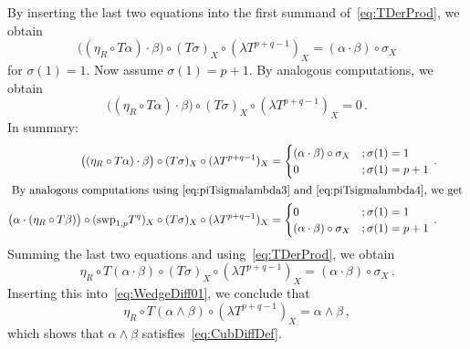 \documentclass[12pt,reqno, a4paper]{amsart}
\numberwithin{equation}{section}
\theoremstyle{plain}
\theoremstyle{definition}
\theoremstyle{remark}
\newcommand{\Val}{\eta}
\newcommand{\Swp}{\mathrm{swp}}
\begin{document}
By inserting the last two equations into the first summand of~\eqref{eq:TDerProd}, we obtain
\begin{equation}
  \bigl((\Val_R \circ T\alpha) \cdot \beta \bigr)
  \circ (T\sigma)_X \circ (\lambda T^{p+q-1})_X
  = (\alpha \cdot \beta) \circ \sigma_X
\end{equation}
for $\sigma(1) = 1$. Now assume $\sigma(1) = p+1$. By analogous computations, we obtain
\begin{equation}
  \bigl((\Val_R \circ T\alpha) \cdot \beta \bigr)
  \circ (T\sigma)_X \circ (\lambda T^{p+q-1})_X
  = 0
  \,.
\end{equation}
In summary:
\begin{align*}
  \bigl((\Val_R \circ T\alpha) \cdot \beta \bigr)
  \circ (T\sigma)_X \circ (\lambda T^{p+q-1})_X
  &=
  \begin{cases}
    (\alpha \cdot \beta) \circ \sigma_X &; \sigma(1) = 1 \\
    0 &;  \sigma(1) = p+1
  \end{cases}
  \,.
  \\
  \intertext{
By analogous computations using~\eqref{eq:piTsigmalambda3} and \eqref{eq:piTsigmalambda4}, we get
  }
  \bigl( \alpha \cdot (\Val_R \circ T\beta) \bigr) \circ
  (\Swp_{1,p}T^q)_X \circ
  (T\sigma)_X \circ (\lambda T^{p+q-1})_X
  &=
  \begin{cases}
    0 &; \sigma(1) = 1 \\
    (\alpha \cdot \beta) \circ \sigma_X &;  \sigma(1) = p+1
  \end{cases}
  \,.
\end{align*}
Summing the last two equations and using~\eqref{eq:TDerProd}, we obtain
\begin{equation*}
  \Val_R \circ T(\alpha \cdot \beta) \circ (T\sigma)_X \circ (\lambda T^{p+q-1})_X
  =
  (\alpha \cdot \beta) \circ \sigma_X
  \,.
\end{equation*}
Inserting this into~\eqref{eq:WedgeDiff01}, we conclude that
\begin{equation*}
  \Val_R \circ T(\alpha \wedge \beta) \circ (\lambda T^{p+q-1})_X
  =  \alpha \wedge \beta
  \,,
\end{equation*}
which shows that $\alpha \wedge \beta$ satisfies~\eqref{eq:CubDiffDef}.
\end{document}
